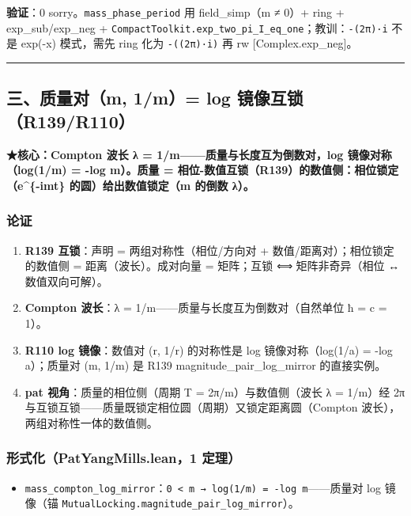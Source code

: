 \documentclass[
]{article}
\providecommand{\tightlist}{%
  \setlength{\itemsep}{0pt}\setlength{\parskip}{0pt}}
\begin{document}
\textbf{验证}：0 sorry。\texttt{mass\_phase\_period} 用 field\_simp（m ≠
0）+ ring + exp\_sub/exp\_neg +
\texttt{CompactToolkit.exp\_two\_pi\_I\_eq\_one}；教训：\texttt{-(2π)·i}
不是 exp(-x) 模式，需先 ring 化为 \texttt{-((2π)·i)} 再 rw
{[}Complex.exp\_neg{]}。

\begin{center}\rule{0.5\linewidth}{0.5pt}\end{center}

\subsection{三、质量对（m, 1/m）= log
镜像互锁（R139/R110）}\label{ux4e09ux8d28ux91cfux5bf9m-1m-log-ux955cux50cfux4e92ux9501r139r110}

\textbf{★核心：Compton 波长 λ = 1/m------质量与长度互为倒数对，log
镜像对称（log(1/m) = -log m）。质量 =
相位-数值互锁（R139）的数值侧：相位锁定（e\^{}\{-imt\}
的圆）给出数值锁定（m 的倒数 λ）。}

\subsubsection{论证}\label{ux8bbaux8bc1-2}

\begin{enumerate}
\def\labelenumi{\arabic{enumi}.}
\tightlist
\item
  \textbf{R139 互锁}：声明 = 两组对称性（相位/方向对 +
  数值/距离对）；相位锁定的数值侧 = 距离（波长）。成对向量 = 矩阵；互锁
  ⟺ 矩阵非奇异（相位 ↔ 数值双向可解）。
\item
  \textbf{Compton 波长}：λ = 1/m------质量与长度互为倒数对（自然单位 ħ =
  c = 1）。
\item
  \textbf{R110 log 镜像}：数值对 (r, 1/r) 的对称性是 log
  镜像对称（log(1/a) = -log a）；质量对 (m, 1/m) 是 R139
  magnitude\_pair\_log\_mirror 的直接实例。
\item
  \textbf{pat 视角}：质量的相位侧（周期 T = 2π/m）与数值侧（波长 λ =
  1/m）经 2π
  与互锁互锁------质量既锁定相位圆（周期）又锁定距离圆（Compton
  波长），两组对称性一体的数值侧。
\end{enumerate}

\subsubsection{形式化（PatYangMills.lean，1
定理）}\label{ux5f62ux5f0fux5316patyangmills.lean1-ux5b9aux7406-1}

\begin{itemize}
\tightlist
\item
  \texttt{mass\_compton\_log\_mirror}：\texttt{0\ \textless{}\ m\ →\ log(1/m)\ =\ -log\ m}------质量对
  log 镜像（锚 \texttt{MutualLocking.magnitude\_pair\_log\_mirror}）。
\end{itemize}
\end{document}
